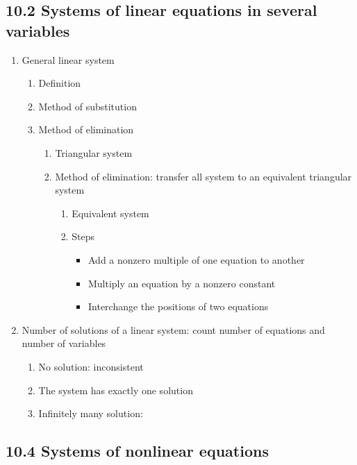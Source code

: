 \documentclass{article}
\begin{document}
\subsection{10.2 Systems of linear equations in several variables}

\begin{enumerate}
\item General linear system
\begin{enumerate}
\item Definition
\item Method of substitution
\item Method of elimination
\begin{enumerate}
\item Triangular system
\item Method of elimination: transfer all system to an equivalent triangular system
\begin{enumerate}
\item Equivalent system
\item Steps
\begin{itemize}
\item Add a nonzero multiple of one equation to another
\item Multiply an equation by a nonzero constant
\item Interchange the positions of two equations
\end{itemize}
\end{enumerate}
\end{enumerate}
\end{enumerate}
\item Number of solutions of a linear system: count number of equations and number of variables
\begin{enumerate}
\item No solution: inconsistent
\item The system has exactly one solution
\item Infinitely many solution: 
\end{enumerate}
\end{enumerate}

\subsection{10.4 Systems of nonlinear equations}
\end{document}
